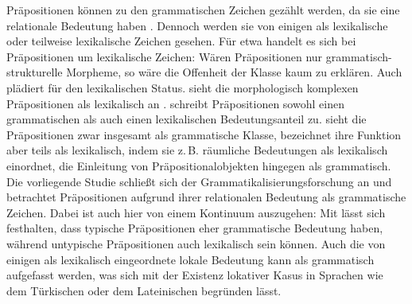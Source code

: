 Präpositionen können zu den grammatischen Zeichen gezählt werden, da sie eine relationale Bedeutung haben \citep[s.][93]{Szczepaniak2011}. 
Dennoch werden sie von einigen als lexikalische oder teilweise lexikalische Zeichen gesehen. 
Für \citet[2076]{Zifonun1997} etwa handelt es sich bei Präpositionen um lexikalische Zeichen: \glqq W{\"a}ren Pr{\"a}positionen nur grammatisch-strukturelle Morpheme, so w{\"a}re die Offenheit der Klasse kaum zu erkl{\"a}ren\grqq. 
Auch \cite{Rauh1990} plädiert für den lexikalischen Status. 
\citet[182]{Eisenberg.2013} sieht die morphologisch komplexen Pr{\"a}positionen als lexikalisch an \citep[s. auch][]{Eisenberg1979}. 
\citet[136]{Eroms1981} schreibt Präpositionen sowohl einen grammatischen als auch einen lexikalischen Bedeutungsanteil zu.
\citet[42]{Romare.2004} sieht die Präpositionen zwar insgesamt als grammatische Klasse, bezeichnet ihre Funktion aber teils als lexikalisch, indem sie z.\,B. r{\"a}umliche Bedeutungen als lexikalisch einordnet, die Einleitung von Pr{\"a}positionalobjekten hingegen als grammatisch.
Die vorliegende Studie schließt sich der Grammatikalisierungsforschung an und betrachtet Präpositionen aufgrund ihrer relationalen Bedeutung als grammatische Zeichen. 
Dabei ist auch hier von einem Kontinuum auszugehen: Mit \citet[16, 306]{Lindqvist1994} lässt sich festhalten, dass typische Präpositionen eher grammatische Bedeutung haben, während untypische Präpositionen auch lexikalisch sein können.   
Auch die von einigen als lexikalisch eingeordnete lokale Bedeutung kann als grammatisch aufgefasst werden, was sich mit der Existenz lokativer Kasus in Sprachen wie dem Türkischen oder dem Lateinischen begründen lässt. 

